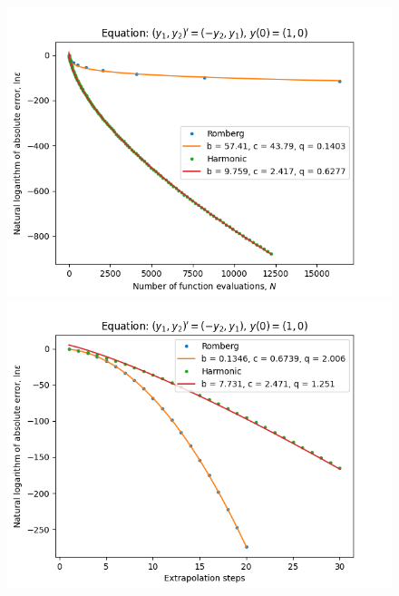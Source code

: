 \begin{figure}[H]
\centering
\begin{minipage}{0.45\textwidth}
\centering
\includegraphics[scale=0.45]{../results/emr_plots/rotation_hp_trend.png}
\end{minipage}
\begin{minipage}{0.45\textwidth}
\centering
\includegraphics[scale=0.45]{../results/emr_plots/rotation_hp_steps.png}
\end{minipage}
\end{figure}

